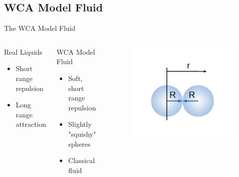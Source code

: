 \documentclass{beamer}
\begin{document}
\subsection*{WCA Model Fluid}
\begin{frame}{The WCA Model Fluid}
	\begin{columns}[t]
		\begin{block}{Real Liquids}
			\begin{itemize}
				\item Short range repulsion 
				\item Long range attraction 
			\end{itemize}
		\end{block}
		\begin{block}{WCA Model Fluid}
			\begin{itemize}
				\item Soft, short range repulsion
				\item Slightly "squishy" spheres
				\item Classical fluid				
			\end{itemize}
		\end{block}		
		\vspace{-3em}
          \begin{figure}
             \centering
             \includegraphics[width=1.1\columnwidth]{figs/TwoSpheresandplot.pdf} 
          \end{figure} 	 
	\end{columns}	
\end{frame}
\end{document}
